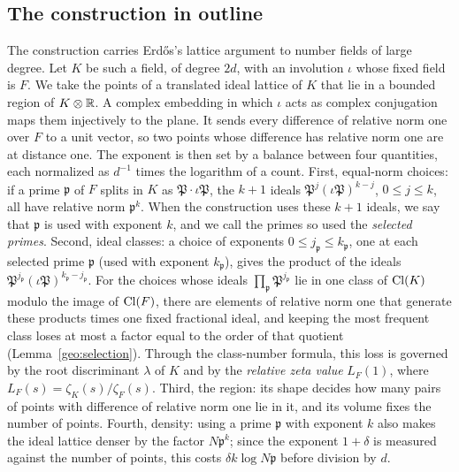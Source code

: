 \subsection{The construction in outline}\label{intro:outline}
The construction carries Erd\H{o}s's lattice argument to number fields
of large degree. Let $K$ be such a field, of degree $2d$, with an
involution $\iota$ whose fixed field is $F$. We take the points of a
translated ideal lattice of $K$ that lie in a bounded region of
$K\otimes\mathbb R$. A complex embedding in which $\iota$ acts as complex
conjugation maps them injectively to the plane. It sends every
difference of relative norm one over $F$ to a unit vector, so two points
whose difference has relative norm one are at distance one. The
exponent is then set by a balance between four quantities, each
normalized as $d^{-1}$ times the logarithm of a count. First,
equal-norm choices: if a prime $\mathfrak p$ of $F$ splits in $K$ as
$\mathfrak P\cdot\iota\mathfrak P$, the $k+1$ ideals
$\mathfrak P^j(\iota\mathfrak P)^{k-j}$, $0\le j\le k$, all have
relative norm $\mathfrak p^k$. When the construction uses these $k+1$
ideals, we say that $\mathfrak p$ is used with exponent $k$, and we call
the primes so used the \emph{selected primes}. Second, ideal classes:
a choice of exponents $0\le j_{\mathfrak p}\le k_{\mathfrak p}$, one at
each selected prime $\mathfrak p$ (used with exponent $k_{\mathfrak p}$),
gives the product of the ideals
$\mathfrak P^{j_{\mathfrak p}}(\iota\mathfrak P)^{k_{\mathfrak p}-j_{\mathfrak p}}$.
For the choices whose ideals $\prod_{\mathfrak p}\mathfrak P^{j_{\mathfrak p}}$
lie in one class of $\operatorname{Cl}(K)$ modulo the image of $\operatorname{Cl}(F)$, there are
elements of relative norm one that generate these products times one
fixed fractional ideal, and keeping the most frequent class loses at
most a factor equal to the order of that quotient
(Lemma~\ref{geo:selection}).
Through the class-number formula, this loss is governed by the root
discriminant $\lambda$ of $K$ and by the \emph{relative zeta value}
$L_F(1)$, where $L_F(s)=\zeta_K(s)/\zeta_F(s)$. Third, the region: its
shape decides how many pairs of points with difference of relative norm
one lie in it, and its volume fixes the number of points. Fourth,
density: using a prime $\mathfrak p$ with exponent $k$ also makes the
ideal lattice denser by the factor $N\mathfrak p^k$; since the exponent
$1+\delta$ is measured against the number of points, this costs
$\delta k\log N\mathfrak p$ before division by $d$.

